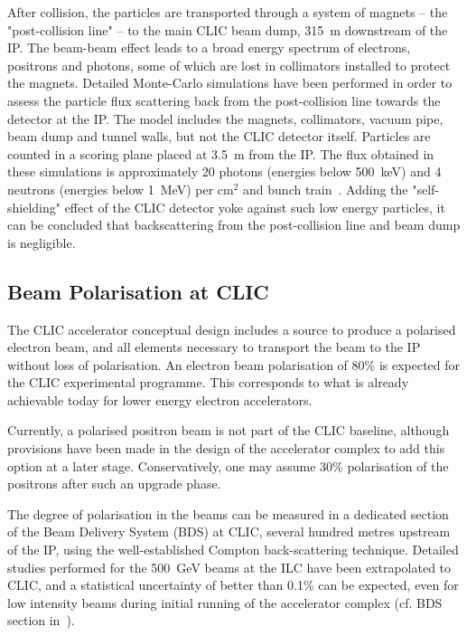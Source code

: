 After collision, the particles are transported through a system of magnets -- 
the "post-collision line" -- to the main CLIC beam dump, 315~m downstream of the
\acs{IP}.
The beam-beam effect leads to a broad energy spectrum of electrons, positrons and photons,
some of which are lost in collimators installed to protect the magnets. Detailed Monte-Carlo simulations
have been performed in order to assess the particle flux scattering back from the post-collision line
towards the detector at the IP\@. The model includes the magnets, collimators, vacuum pipe, beam dump and tunnel walls,
but not the CLIC detector itself. Particles are counted in a scoring plane placed at 3.5~m from the IP.
The flux obtained in these simulations is approximately 20 photons (energies below 500~keV)
and 4 neutrons (energies below 1~MeV) per cm$^2$ and bunch train~\cite{EddaatIPAC11}. Adding the "self-shielding" effect of 
the CLIC detector yoke against such low energy particles, it can be concluded that backscattering from the 
post-collision line and beam dump is negligible.

\subsection{Beam Polarisation at CLIC\label{sec:chapter3:environment:polarisation}}
The CLIC accelerator conceptual design includes a source to produce a polarised electron beam,
and all elements necessary to transport the beam to the IP without loss of polarisation. 
An electron beam polarisation of 80\% is expected for the CLIC experimental programme. 
This corresponds to what is already achievable today for lower energy electron accelerators.   
   
Currently, a polarised positron beam is not part of the CLIC baseline, although provisions have been made
in the design of the accelerator complex to add this option at a later stage. 
Conservatively, one may assume 30\% polarisation of the positrons after such an upgrade phase.

The degree of polarisation in the beams can be measured in a dedicated section of the 
Beam Delivery System (\acs{BDS}) at CLIC, several hundred metres upstream of the IP,
using the well-established Compton back-scattering technique. 
Detailed studies performed for the 500~GeV beams at the ILC have been extrapolated to 
CLIC, and a statistical uncertainty of better than 0.1\% can be expected, 
even for low intensity beams during initial running of the accelerator complex
(cf. \acs{BDS} section in~\cite{CLICacceleratorCDR}).

